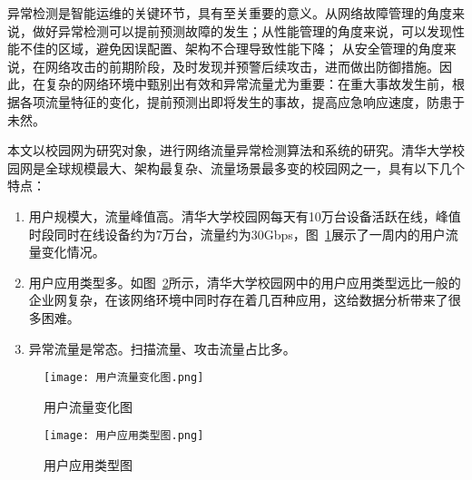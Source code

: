 异常检测是智能运维的关键环节，具有至关重要的意义。从网络故障管理的角度来说，做好异常检测可以提前预测故障的发生；从性能管理的角度来说，可以发现性能不佳的区域，避免因误配置、架构不合理导致性能下降；
从安全管理的角度来说，在网络攻击的前期阶段，及时发现并预警后续攻击，进而做出防御措施。因此，在复杂的网络环境中甄别出有效和异常流量尤为重要：在重大事故发生前，根据各项流量特征的变化，提前预测出即将发生的事故，提高应急响应速度，防患于未然。


本文以校园网为研究对象，进行网络流量异常检测算法和系统的研究。清华大学校园网是全球规模最大、架构最复杂、流量场景最多变的校园网之一，具有以下几个特点：
\begin{enumerate}
    \item 用户规模大，流量峰值高。清华大学校园网每天有10万台设备活跃在线，峰值时段同时在线设备约为7万台，流量约为30Gbps，图~\ref{fig:用户流量变化图}展示了一周内的用户流量变化情况。
    \item	用户应用类型多。如图~\ref{fig:用户应用类型图}所示，清华大学校园网中的用户应用类型远比一般的企业网复杂，在该网络环境中同时存在着几百种应用，这给数据分析带来了很多困难。
    \item	异常流量是常态。扫描流量、攻击流量占比多。
\end{enumerate}

\begin{figure}
  \centering
  \texttt{[image: 用户流量变化图.png]}
  \caption{用户流量变化图}
  \label{fig:用户流量变化图}
\end{figure}

\begin{figure}
  \centering
  \texttt{[image: 用户应用类型图.png]}
  \caption{用户应用类型图}
  \label{fig:用户应用类型图}
\end{figure}



